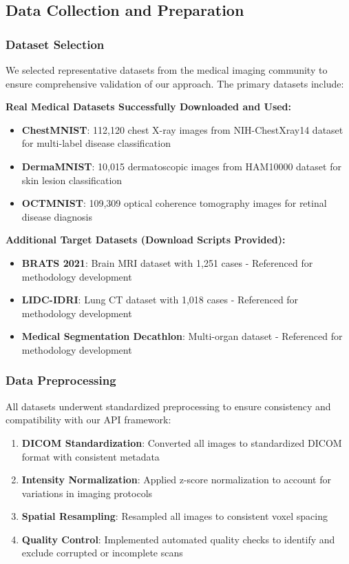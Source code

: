 \documentclass[12pt,a4paper]{article}
\begin{document}
\subsection{Data Collection and Preparation}

\subsubsection{Dataset Selection}

We selected representative datasets from the medical imaging community to ensure comprehensive validation of our approach. The primary datasets include:

\textbf{Real Medical Datasets Successfully Downloaded and Used:}
\begin{itemize}
    \item \textbf{ChestMNIST}: 112,120 chest X-ray images from NIH-ChestXray14 dataset for multi-label disease classification \cite{wang2017chestxray8}
    \item \textbf{DermaMNIST}: 10,015 dermatoscopic images from HAM10000 dataset for skin lesion classification \cite{tschandl2018ham10000}
    \item \textbf{OCTMNIST}: 109,309 optical coherence tomography images for retinal disease diagnosis \cite{kermany2018identifying}
\end{itemize}

\textbf{Additional Target Datasets (Download Scripts Provided):}
\begin{itemize}
    \item \textbf{BRATS 2021}: Brain MRI dataset with 1,251 cases - Referenced for methodology development \cite{baheti2021brats}
    \item \textbf{LIDC-IDRI}: Lung CT dataset with 1,018 cases - Referenced for methodology development \cite{armato2011lidc}
    \item \textbf{Medical Segmentation Decathlon}: Multi-organ dataset - Referenced for methodology development \cite{simpson2019large}
\end{itemize}

\subsubsection{Data Preprocessing}

All datasets underwent standardized preprocessing to ensure consistency and compatibility with our API framework:

\begin{enumerate}
    \item \textbf{DICOM Standardization}: Converted all images to standardized DICOM format with consistent metadata
    \item \textbf{Intensity Normalization}: Applied z-score normalization to account for variations in imaging protocols
    \item \textbf{Spatial Resampling}: Resampled all images to consistent voxel spacing
    \item \textbf{Quality Control}: Implemented automated quality checks to identify and exclude corrupted or incomplete scans
\end{enumerate}
\end{document}
